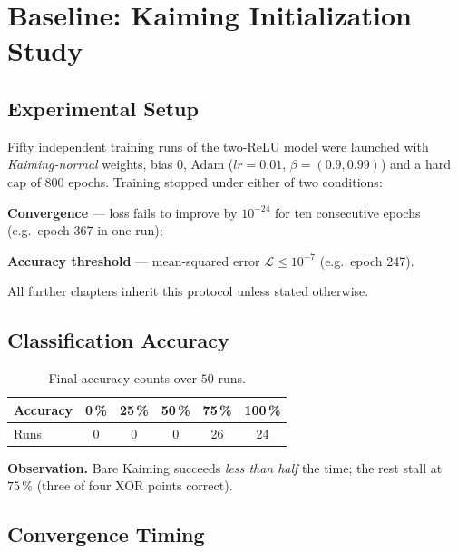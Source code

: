 
\section{Baseline: Kaiming Initialization Study}
\label{sec:relu1-kaiming}

\subsection*{Experimental Setup}
Fifty independent training runs of the two-ReLU model were launched with
\emph{Kaiming-normal} weights, bias $0$, Adam
($lr=0.01$, $\beta=(0.9,0.99)$) and a hard cap of $800$ epochs.
Training stopped under either of two conditions:
\begin{enumerate*}[label=(\roman*)]
    \item \textbf{Convergence} — loss fails to improve by
          $10^{-24}$ for ten consecutive epochs
          (e.g.\ epoch 367 in one run);
    \item \textbf{Accuracy threshold} — mean-squared error
          $\mathcal L\le10^{-7}$ (e.g.\ epoch 247).
\end{enumerate*}
All further chapters inherit this protocol unless stated otherwise.

\subsection*{Classification Accuracy}

\begin{table}[h]
\centering
\caption{Final accuracy counts over $50$ runs.}
\label{tab:relu1-kaiming-accuracy}
\begin{tabular}{lccccc}
\toprule
Accuracy & 0\,\% & 25\,\% & 50\,\% & 75\,\% & 100\,\% \\ \midrule
Runs & 0 & 0 & 0 & 26 & 24 \\ \bottomrule
\end{tabular}
\end{table}

\textbf{Observation.}  
Bare Kaiming succeeds \emph{less than half} the time; the rest stall at
$75\,\%$ (three of four XOR points correct).

\subsection*{Convergence Timing}

